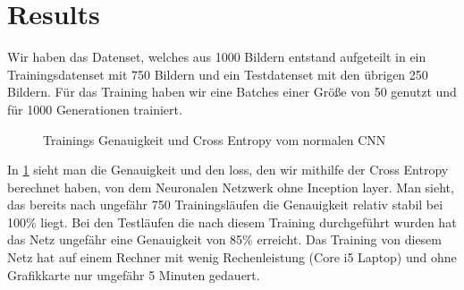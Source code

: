 \documentclass[runningheads,a4paper]{llncs}[2015/06/24]
\begin{document}
\section{Results}\label{sec:result}
Wir haben das Datenset, welches aus 1000 Bildern entstand aufgeteilt in ein Trainingsdatenset mit 750 Bildern und ein Testdatenset mit den übrigen 250 Bildern. Für das Training haben wir eine Batches einer Größe von 50 genutzt und für 1000 Generationen trainiert. \\

\begin{figure}
	\caption{Trainings Genauigkeit und Cross Entropy vom normalen CNN}
	\label{fig:conv_result_graph}
\end{figure}
In \cref{fig:conv_result_graph} sieht man die Genauigkeit und den loss, den wir mithilfe der Cross Entropy berechnet haben, von dem Neuronalen Netzwerk ohne Inception layer. Man sieht, das bereits nach ungefähr 750 Trainingsläufen die Genauigkeit relativ stabil bei 100\% liegt. Bei den Testläufen die nach diesem Training durchgeführt wurden hat das Netz ungefähr eine Genauigkeit von 85\% erreicht. Das Training von diesem Netz hat auf einem Rechner mit wenig Rechenleistung (Core i5 Laptop) und ohne Grafikkarte nur ungefähr 5 Minuten gedauert.\\
\end{document}
